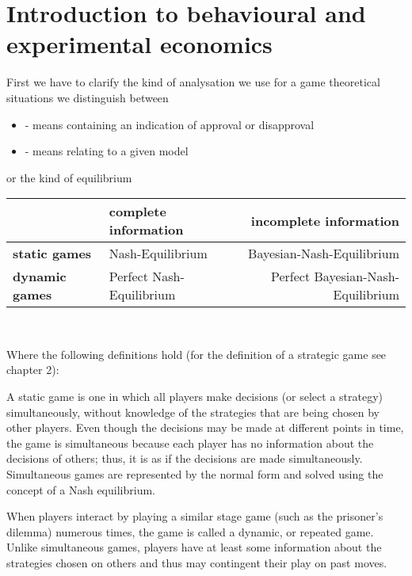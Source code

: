 

\chapter{Introduction to behavioural and experimental economics}

First we have to clarify the kind of analysation we use for a game theoretical situations we distinguish between
\begin{itemize}
	\item {} - means containing an indication of approval or disapproval
	\item {} - means relating to a given model
\end{itemize}

or the kind of equilibrium

\begin{tabular}{|l|l|r|}
	\hline\hline
  			& {\textbf{complete information}} & {\textbf{incomplete information}} \\
                                                    \hline
   \textbf{static games} & Nash-Equilibrium & Bayesian-Nash-Equilibrium\arrayrulewidth2pt \\
                                               \cline{1-3}
   \textbf{dynamic games} & Perfect Nash-Equilibrium & Perfect Bayesian-Nash-Equilibrium \\ \hline\hline
\end{tabular}
	
~\newline	
	
Where the following definitions hold (for the definition of a strategic game see chapter 2):

\begin{definition} 
	A static game is one in which all players make decisions (or select a strategy) simultaneously, without knowledge of the strategies that are being chosen by other players. Even though the decisions may be made at different points in time, the game is simultaneous because each player has no information about the decisions of others; thus, it is as if the decisions are made simultaneously. Simultaneous games are represented by the normal form and solved using the concept of a Nash equilibrium.
\end{definition}

\begin{definition} 
When players interact by playing a similar stage game (such as the prisoner's dilemma) numerous times, the game is called a dynamic, or repeated game. Unlike simultaneous games, players have at least some information about the strategies chosen on others and thus may contingent their play on past moves.
\end{definition}

